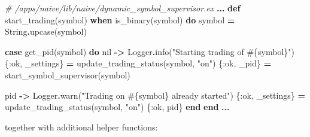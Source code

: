 \documentclass[
]{book}
\newenvironment{Shaded}{\begin{snugshade}}{\end{snugshade}}
\newcommand{\CommentTok}[1]{\textcolor[rgb]{0.56,0.35,0.01}{\textit{#1}}}
\newcommand{\ConstantTok}[1]{\textcolor[rgb]{0.00,0.00,0.00}{#1}}
\newcommand{\KeywordTok}[1]{\textcolor[rgb]{0.13,0.29,0.53}{\textbf{#1}}}
\newcommand{\NormalTok}[1]{#1}
\newcommand{\OperatorTok}[1]{\textcolor[rgb]{0.81,0.36,0.00}{\textbf{#1}}}
\newcommand{\OtherTok}[1]{\textcolor[rgb]{0.56,0.35,0.01}{#1}}
\newcommand{\StringTok}[1]{\textcolor[rgb]{0.31,0.60,0.02}{#1}}
\newcommand{\VariableTok}[1]{\textcolor[rgb]{0.00,0.00,0.00}{#1}}
\begin{document}
\begin{Shaded}
\begin{Highlighting}[]
\CommentTok{\# /apps/naive/lib/naive/dynamic\_symbol\_supervisor.ex}
  \OperatorTok{...}
  \KeywordTok{def}\NormalTok{ start\_trading(symbol) }\KeywordTok{when}\NormalTok{ is\_binary(symbol) }\KeywordTok{do}
\NormalTok{    symbol }\OperatorTok{=} \ConstantTok{String}\OperatorTok{.}\NormalTok{upcase(symbol)}
    
    \KeywordTok{case}\NormalTok{ get\_pid(symbol) }\KeywordTok{do}
      \ConstantTok{nil} \OperatorTok{{-}\textgreater{}}
        \ConstantTok{Logger}\OperatorTok{.}\NormalTok{info(}\StringTok{"Starting trading of }\OtherTok{\#\{}\NormalTok{symbol}\OtherTok{\}}\StringTok{"}\NormalTok{)}
\NormalTok{        \{}\VariableTok{:ok}\NormalTok{, \_settings\} }\OperatorTok{=}\NormalTok{ update\_trading\_status(symbol, }\StringTok{"on"}\NormalTok{)}
\NormalTok{        \{}\VariableTok{:ok}\NormalTok{, \_pid\} }\OperatorTok{=}\NormalTok{ start\_symbol\_supervisor(symbol)}

\NormalTok{      pid }\OperatorTok{{-}\textgreater{}}
        \ConstantTok{Logger}\OperatorTok{.}\NormalTok{warn(}\StringTok{"Trading on }\OtherTok{\#\{}\NormalTok{symbol}\OtherTok{\}}\StringTok{ already started"}\NormalTok{)}
\NormalTok{        \{}\VariableTok{:ok}\NormalTok{, \_settings\} }\OperatorTok{=}\NormalTok{ update\_trading\_status(symbol, }\StringTok{"on"}\NormalTok{)}
\NormalTok{        \{}\VariableTok{:ok}\NormalTok{, pid\}}
    \KeywordTok{end}
  \KeywordTok{end}
  \OperatorTok{...}
\end{Highlighting}
\end{Shaded}

together with additional helper functions:
\end{document}
